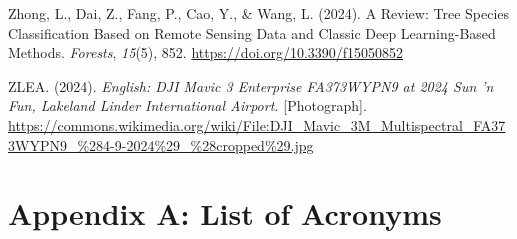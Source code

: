 \documentclass[
]{scrreprt}
\newlength{\cslhangindent}
\newenvironment{CSLReferences}[2] %
 {\begin{list}{}{%
  \setlength{\itemindent}{0pt}
  \setlength{\leftmargin}{0pt}
  \setlength{\parsep}{0pt}
  \setlength{\baselineskip}{12pt}
  \ifodd #1
   \setlength{\leftmargin}{\cslhangindent}
   \setlength{\itemindent}{-1\cslhangindent}
  \fi
  \setlength{\itemsep}{4pt}}}
 {\end{list}}
\begin{document}
\begin{CSLReferences}{1}{0}
Zhong, L., Dai, Z., Fang, P., Cao, Y., \& Wang, L. (2024). A {Review}:
{Tree Species Classification Based} on {Remote Sensing Data} and
{Classic Deep Learning-Based Methods}. \emph{Forests}, \emph{15}(5),
852. \url{https://doi.org/10.3390/f15050852}

ZLEA. (2024). \emph{English: {DJI Mavic} 3 {Enterprise FA373WYPN9} at
2024 {Sun} 'n {Fun}, {Lakeland Linder International Airport}.}
{[}Photograph{]}.
\url{https://commons.wikimedia.org/wiki/File:DJI_Mavic_3M_Multispectral_FA373WYPN9_\%284-9-2024\%29_\%28cropped\%29.jpg}

\end{CSLReferences}

\newpage{}

\chapter*{Appendix A: List of
Acronyms}\label{appendix-a-list-of-acronyms}
\end{document}
